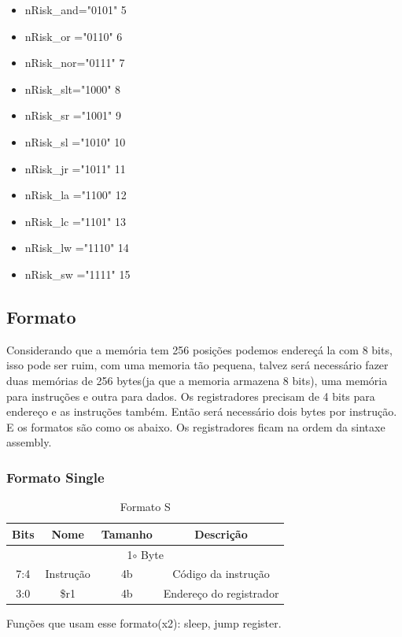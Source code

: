 \documentclass[a4paper, 10pt]{article}
\begin{document}
\begin{itemize}
		\item nRisk\_and="0101" 5\\
		
		\item nRisk\_or ="0110" 6\\
		
		\item nRisk\_nor="0111" 7\\
		
		\item nRisk\_slt="1000" 8\\
		
		\item nRisk\_sr ="1001" 9\\
		
		\item nRisk\_sl ="1010" 10\\
		
		\item nRisk\_jr ="1011" 11\\
		
		\item nRisk\_la ="1100" 12\\
		
		\item nRisk\_lc ="1101" 13\\
		
		\item nRisk\_lw ="1110" 14\\
		
		\item nRisk\_sw ="1111" 15\\
\end{itemize}
\subsection{Formato}
Considerando que a memória tem 256 posições podemos endereçá la com 8 bits, isso pode ser ruim, com uma memoria tão pequena, talvez será necessário fazer duas memórias de 256 bytes(ja que a memoria armazena 8 bits), uma memória para instruções e outra para dados. Os registradores precisam de 4 bits para endereço e as instruções também. Então será necessário dois bytes por instrução. E os formatos são como os abaixo. Os registradores ficam na ordem da sintaxe assembly.
\subsubsection{Formato Single}
\begin{table}[h!]
	\centering
	\caption{Formato S}
	\label{tab:formatoSingle}
	\begin{tabular}{c c c c}
		\hline
		Bits & Nome & Tamanho & Descrição \\
		\hline
		\multicolumn{4}{c}{1$\circ$  Byte}       \\
		\hline
		7:4&Instrução&4b & Código da instrução\\
		3:0& \$r1 &4b & Endereço do registrador\\
		\hline
	\end{tabular}
\end{table}
Funções que usam esse formato(x2): sleep, jump register.
\newpage
\end{document}
